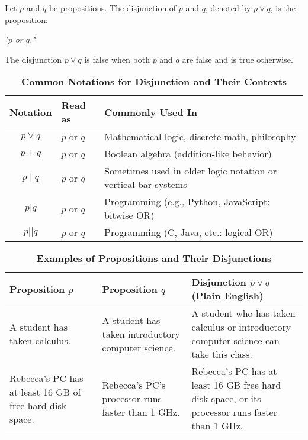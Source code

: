 \vspace{5pt}
\begin{tcolorbox}[title=Definition: Disjunction]
Let $p$ and $q$ be propositions. The disjunction of $p$ and $q$, denoted by $p \lor q$, is the proposition:
\begin{center}
\textit{"$p$ or $q$."}
\end{center}
The disjunction $p \lor q$ is false when both $p$ and $q$ are false and is true otherwise.
\end{tcolorbox}
\begin{table}[h!]
\centering
\caption*{\textbf{Common Notations for Disjunction and Their Contexts}}
\begin{tabular}{|c|l|l|}
\hline
\rowcolor{gray!20}
\textbf{Notation} & \textbf{Read as} & \textbf{Commonly Used In} \\
\hline
$p \lor q$ & $p$ or $q$ & Mathematical logic, discrete math, philosophy \\
$p + q$ & $p$ or $q$ & Boolean algebra (addition-like behavior) \\
$p \mid q$ & $p$ or $q$ & Sometimes used in older logic notation or vertical bar systems \\
$p \texttt{|} q$ & $p$ or $q$ & Programming (e.g., Python, JavaScript: bitwise OR) \\
$p \texttt{||} q$ & $p$ or $q$ & Programming (C, Java, etc.: logical OR) \\
\hline
\end{tabular}
\end{table}
\begin{table}[h!]
\centering
\caption*{\textbf{Examples of Propositions and Their Disjunctions}}
\begin{tabular}{|p{4.5cm}|p{4.5cm}|p{6cm}|}
\hline
\rowcolor{gray!20}
\textbf{Proposition $p$} & \textbf{Proposition $q$} & \textbf{Disjunction $p \lor q$ (Plain English)} \\
\hline
A student has taken calculus. & A student has taken introductory computer science. & A student who has taken calculus or introductory computer science can take this class. \\
Rebecca’s PC has at least 16 GB of free hard disk space. & Rebecca’s PC’s processor runs faster than 1 GHz. & Rebecca’s PC has at least 16 GB free hard disk space, or its processor runs faster than 1 GHz. \\
\hline
\end{tabular}
\end{table}
